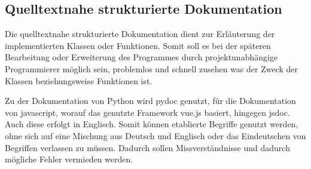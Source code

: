 \subsection{Quelltextnahe strukturierte Dokumentation}
Die quelltextnahe strukturierte Dokumentation dient zur Erläuterung der implementierten Klassen oder Funktionen. Somit soll es bei der späteren Bearbeitung oder Erweiterung des Programmes durch projektunabhängige Programmierer möglich sein, problemlos und schnell zusehen was der Zweck der Klassen beziehungsweise Funktionen ist.

Zu der Dokumentation von Python wird pydoc genutzt, für die Dokumentation von javascript, worauf das genutzte Framework vue.js basiert, hingegen jsdoc. Auch diese erfolgt in Englisch. Somit können etablierte Begriffe genutzt werden, ohne sich auf eine Mischung aus Deutsch und Englisch oder das Eindeutschen von Begriffen verlassen zu müssen. Dadurch sollen Missverständnisse und dadurch mögliche Fehler vermieden werden.